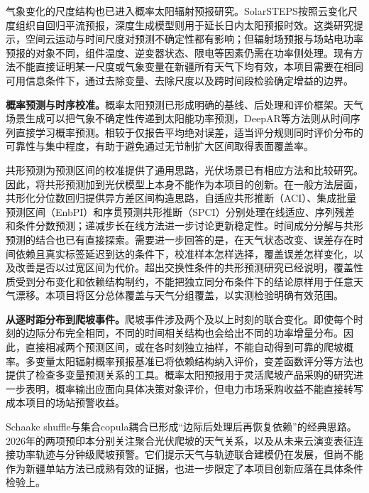 气象变化的尺度结构也已进入概率太阳辐射预报研究。SolarSTEPS按照云变化尺度组织自回归平流预报，深度生成模型则用于延长日内太阳预报时效\cite{carpentieri2023solarsteps,carpentieri2025shadecast}。这类研究提示，空间云运动与时间尺度对预测不确定性都有影响；但辐射场预报与场站电功率预报的对象不同，组件温度、逆变器状态、限电等因素仍需在功率侧处理。现有方法不能直接证明某一尺度或气象变量在新疆所有天气下均有效，本项目需要在相同可用信息条件下，通过去除变量、去除尺度以及跨时间段检验确定增益的边界。

\textbf{概率预测与时序校准。}概率太阳预测已形成明确的基线、后处理和评价框架\cite{gneiting2023solar}。天气场景生成可以把气象不确定性传递到太阳能功率预测，DeepAR等方法则从时间序列直接学习概率预测\cite{sun2020scenario,salinas2020deepar}。相较于仅报告平均绝对误差，适当评分规则同时评价分布的可靠性与集中程度，有助于避免通过无节制扩大区间取得表面覆盖率\cite{gneiting2007proper}。

共形预测为预测区间的校准提供了通用思路，光伏场景已有相应方法和比较研究\cite{renkema2024conformal,solarcp2025comparative}。因此，将共形预测加到光伏模型上本身不能作为本项目的创新。在一般方法层面，共形化分位数回归提供异方差区间构造思路，自适应共形推断（ACI）、集成批量预测区间（EnbPI）和序贯预测共形推断（SPCI）分别处理在线适应、序列残差和条件分数预测；递减步长在线方法进一步讨论更新稳定性\cite{romano2019cqr,gibbs2021aci,xu2021enbpi,xu2023spci,angelopoulos2024online}。时间成分分解与共形预测的结合也已有直接探索\cite{prinzhorn2024decomposition}。需要进一步回答的是，在天气状态改变、误差存在时间依赖且真实标签延迟到达的条件下，校准样本怎样选择，覆盖误差怎样变化，以及改善是否以过宽区间为代价。超出交换性条件的共形预测研究已经说明，覆盖性质受到分布变化和依赖结构制约，不能把独立同分布条件下的结论原样用于任意天气漂移\cite{barber2023beyond}。本项目将区分总体覆盖与天气分组覆盖，以实测检验明确有效范围。

\textbf{从逐时距分布到爬坡事件。}爬坡事件涉及两个及以上时刻的联合变化。即使每个时刻的边际分布完全相同，不同的时间相关结构也会给出不同的功率增量分布。因此，直接相减两个预测区间，或在各时刻独立抽样，不能自动得到可靠的爬坡概率。多变量太阳辐射概率预报基准已将依赖结构纳入评价，变差函数评分等方法也提供了检查多变量预测关系的工具\cite{meer2021benchmark,scheuerer2015variogram}。概率太阳预报用于灵活爬坡产品采购的研究进一步表明，概率输出应面向具体决策对象评价\cite{hobbs2022ramp}，但电力市场采购收益不能直接转写成本项目的场站预警收益。

Schaake shuffle与集合copula耦合已形成“边际后处理后再恢复依赖”的经典思路\cite{clark2004schaake,schefzik2013ecc}。2026年的两项预印本分别关注聚合光伏爬坡的天气关系，以及从未来云演变表征连接功率轨迹与分钟级爬坡预警\cite{lanzilao2026ramp,wang2026skyramp}。它们提示天气与轨迹联合建模仍在发展，但尚不能作为新疆单站方法已成熟有效的证据，也进一步限定了本项目创新应落在具体条件检验上。

